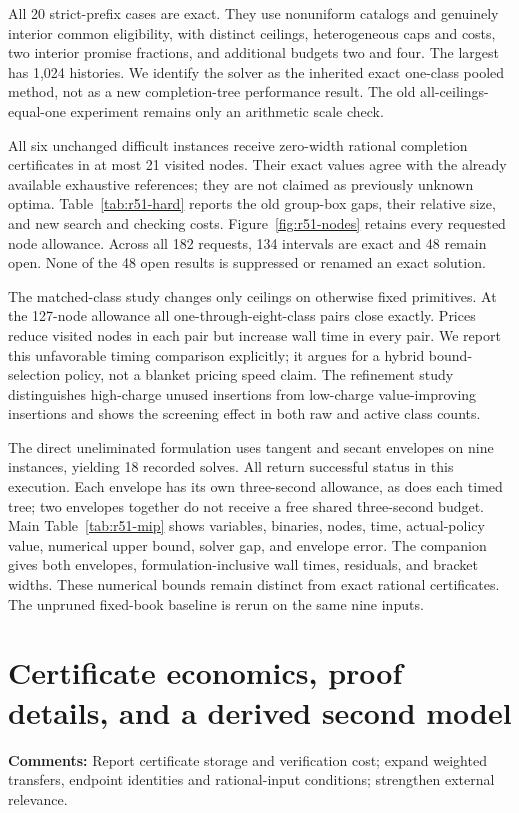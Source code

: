 \documentclass[11pt,letterpaper]{article}
\begin{document}
All 20 strict-prefix cases are exact. They use nonuniform catalogs and genuinely interior common eligibility, with distinct ceilings, heterogeneous caps and costs, two interior promise fractions, and additional budgets two and four. The largest has 1,024 histories. We identify the solver as the inherited exact one-class pooled method, not as a new completion-tree performance result. The old all-ceilings-equal-one experiment remains only an arithmetic scale check.

All six unchanged difficult instances receive zero-width rational completion certificates in at most 21 visited nodes. Their exact values agree with the already available exhaustive references; they are not claimed as previously unknown optima. Table~\ref{tab:r51-hard} reports the old group-box gaps, their relative size, and new search and checking costs. Figure~\ref{fig:r51-nodes} retains every requested node allowance. Across all 182 requests, 134 intervals are exact and 48 remain open. None of the 48 open results is suppressed or renamed an exact solution.

The matched-class study changes only ceilings on otherwise fixed primitives. At the 127-node allowance all one-through-eight-class pairs close exactly. Prices reduce visited nodes in each pair but increase wall time in every pair. We report this unfavorable timing comparison explicitly; it argues for a hybrid bound-selection policy, not a blanket pricing speed claim. The refinement study distinguishes high-charge unused insertions from low-charge value-improving insertions and shows the screening effect in both raw and active class counts.

The direct uneliminated formulation uses tangent and secant envelopes on nine instances, yielding 18 recorded solves. All return successful status in this execution. Each envelope has its own three-second allowance, as does each timed tree; two envelopes together do not receive a free shared three-second budget. Main Table~\ref{tab:r51-mip} shows variables, binaries, nodes, time, actual-policy value, numerical upper bound, solver gap, and envelope error. The companion gives both envelopes, formulation-inclusive wall times, residuals, and bracket widths. These numerical bounds remain distinct from exact rational certificates. The unpruned fixed-book baseline is rerun on the same nine inputs.

\section{Certificate economics, proof details, and a derived second model}
\textbf{Comments:} Report certificate storage and verification cost; expand weighted transfers, endpoint identities and rational-input conditions; strengthen external relevance.
\end{document}
